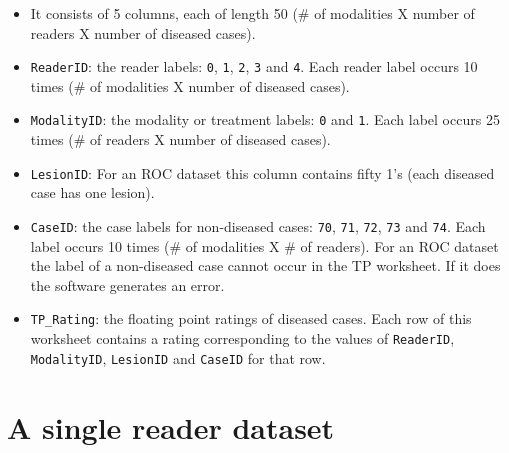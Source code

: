 \documentclass[
]{book}
\newenvironment{Shaded}{\begin{snugshade}}{\end{snugshade}}
\newcommand{\CommentTok}[1]{\textcolor[rgb]{0.56,0.35,0.01}{\textit{#1}}}
\newcommand{\DataTypeTok}[1]{\textcolor[rgb]{0.13,0.29,0.53}{#1}}
\newcommand{\KeywordTok}[1]{\textcolor[rgb]{0.13,0.29,0.53}{\textbf{#1}}}
\newcommand{\NormalTok}[1]{#1}
\newcommand{\OtherTok}[1]{\textcolor[rgb]{0.56,0.35,0.01}{#1}}
\newcommand{\StringTok}[1]{\textcolor[rgb]{0.31,0.60,0.02}{#1}}
\providecommand{\tightlist}{%
  \setlength{\itemsep}{0pt}\setlength{\parskip}{0pt}}
\begin{document}
\begin{itemize}
\tightlist
\item
  It consists of 5 columns, each of length 50 (\# of modalities X number of readers X number of diseased cases).
\item
  \texttt{ReaderID}: the reader labels: \texttt{0}, \texttt{1}, \texttt{2}, \texttt{3} and \texttt{4}. Each reader label occurs 10 times (\# of modalities X number of diseased cases).
\item
  \texttt{ModalityID}: the modality or treatment labels: \texttt{0} and \texttt{1}. Each label occurs 25 times (\# of readers X number of diseased cases).
\item
  \texttt{LesionID}: For an ROC dataset this column contains fifty 1's (each diseased case has one lesion).
\item
  \texttt{CaseID}: the case labels for non-diseased cases: \texttt{70}, \texttt{71}, \texttt{72}, \texttt{73} and \texttt{74}. Each label occurs 10 times (\# of modalities X \# of readers). For an ROC dataset the label of a non-diseased case cannot occur in the TP worksheet. If it does the software generates an error.
\item
  \texttt{TP\_Rating}: the floating point ratings of diseased cases. Each row of this worksheet contains a rating corresponding to the values of \texttt{ReaderID}, \texttt{ModalityID}, \texttt{LesionID} and \texttt{CaseID} for that row.
\end{itemize}

\hypertarget{quick-start-data-format-single-reader}{%
\section{A single reader dataset}\label{quick-start-data-format-single-reader}}

\begin{Shaded}
\end{Shaded}
\end{document}
